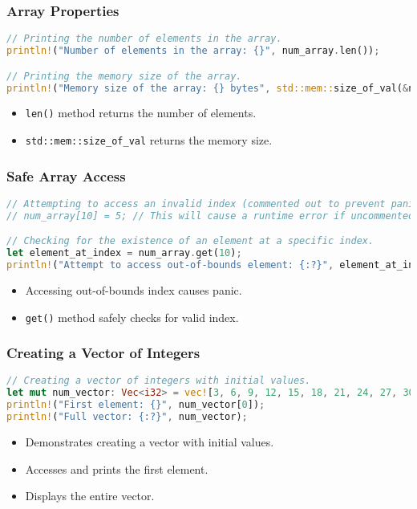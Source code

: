 \documentclass[aspectratio=169, table]{beamer}
\begin{document}
\begin{frame}[fragile]
\frametitle{Array Properties}
\begin{lstlisting}[language=Rust]
// Printing the number of elements in the array.
println!("Number of elements in the array: {}", num_array.len());

// Printing the memory size of the array.
println!("Memory size of the array: {} bytes", std::mem::size_of_val(&num_array));
\end{lstlisting}
\begin{itemize}
\item \texttt{len()} method returns the number of elements.
\item \texttt{std::mem::size\_of\_val} returns the memory size.
\end{itemize}
\end{frame}

\begin{frame}[fragile]
\frametitle{Safe Array Access}
\begin{lstlisting}[language=Rust]
// Attempting to access an invalid index (commented out to prevent panic).
// num_array[10] = 5; // This will cause a runtime error if uncommented.

// Checking for the existence of an element at a specific index.
let element_at_index = num_array.get(10); 
println!("Attempt to access out-of-bounds element: {:?}", element_at_index);
\end{lstlisting}
\begin{itemize}
\item Accessing out-of-bounds index causes panic.
\item \texttt{get()} method safely checks for valid index.
\end{itemize}
\end{frame}

\begin{frame}[fragile]
\frametitle{Creating a Vector of Integers}
\begin{lstlisting}[language=Rust]
// Creating a vector of integers with initial values.
let mut num_vector: Vec<i32> = vec![3, 6, 9, 12, 15, 18, 21, 24, 27, 30, 33, 36];
println!("First element: {}", num_vector[0]);
println!("Full vector: {:?}", num_vector);
\end{lstlisting}
\begin{itemize}
\item Demonstrates creating a vector with initial values.
\item Accesses and prints the first element.
\item Displays the entire vector.
\end{itemize}
\end{frame}
\end{document}
